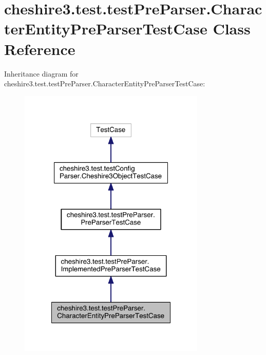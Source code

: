 \hypertarget{classcheshire3_1_1test_1_1test_pre_parser_1_1_character_entity_pre_parser_test_case}{\section{cheshire3.\-test.\-test\-Pre\-Parser.\-Character\-Entity\-Pre\-Parser\-Test\-Case Class Reference}
\label{classcheshire3_1_1test_1_1test_pre_parser_1_1_character_entity_pre_parser_test_case}
}


Inheritance diagram for cheshire3.\-test.\-test\-Pre\-Parser.\-Character\-Entity\-Pre\-Parser\-Test\-Case\-:
\nopagebreak
\begin{figure}[H]
\begin{center}
\leavevmode
\includegraphics[width=252pt]{classcheshire3_1_1test_1_1test_pre_parser_1_1_character_entity_pre_parser_test_case__inherit__graph}
\end{center}
\end{figure}


